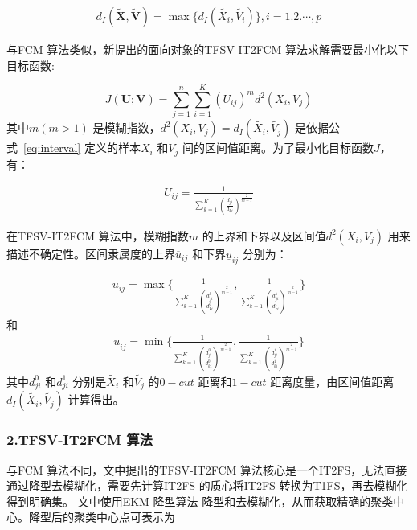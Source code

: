 \begin{equation}\label{eq:eq-6}
    \begin{split}
        d_{I} (\bm{\tilde{X}}, \bm{\tilde{V}}) = \max \lbrace d_{I} (\tilde{X_i}, \tilde{V_i}) \rbrace, i =1.2.\cdots,p
    \end{split}
\end{equation}

与FCM 算法类似，新提出的面向对象的TFSV-IT2FCM 算法求解需要最小化以下目标函数:

\begin{equation}\label{eq:eq-7}
    J(\bm{U};\bm{V}) = \sum _{j=1} ^{n} \sum_{i=1} ^K (U_{ij})^m d^2(X_i,V_j)
\end{equation}
其中$m (m>1)$ 是模糊指数，$d^2(X_i,V_j) = d_{I} (\tilde{X_i}, \tilde{V_j})$ 是依据公式~\ref{eq:interval} 定义的样本$X_i$ 和$V_j$ 间的区间值距离。为了最小化目标函数$J$，有：

\begin{equation}\label{eq:12}
    \begin{split}
        U_{ij} = \frac{1}{\sum_{k=1}^K {(\frac{d_{ji}}{d_{ki}})}^{\frac{2}{m-1}}}
    \end{split}
\end{equation}

在TFSV-IT2FCM 算法中，模糊指数$m$ 的上界和下界以及区间值$d^2(X_i,V_j)$ 用来描述不确定性。区间隶属度的上界$\overline{u}_{ij}$ 和下界$\underline{u}_{ij}$ 分别为：

\begin{equation}\label{eq:13}
    \begin{split}
        \overline{u}_{ij} = \max \Bigg \lbrace \frac{1}{\sum_{k=1}^K {(\frac{d_{ji}^0}{d_{ki}^0})}^{\frac{2}{m-1}}}, \frac{1}{\sum_{k=1}^K {(\frac{d_{ji}^1}{d_{ki}^1})}^{\frac{2}{m-1}}} \Bigg \rbrace
    \end{split}
\end{equation}
和
\begin{equation}\label{eq:14}
    \begin{split}
        \underline{u}_{ij} = \min \Bigg \lbrace \frac{1}{\sum_{k=1}^K {(\frac{d_{ji}^0}{d_{ki}^0})}^{\frac{2}{m-1}}}, \frac{1}{\sum_{k=1}^K {(\frac{d_{ji}^1}{d_{ki}^1})}^{\frac{2}{m-1}}} \Bigg \rbrace
    \end{split}
\end{equation}
其中$d_{ji}^0$ 和$d_{ji}^1$ 分别是$\tilde{X_i}$ 和$\tilde{V_j}$ 的$0-cut$ 距离和$1-cut$ 距离度量，由区间值距离$d_{I} (\tilde{X_i}, \tilde{V_j})$ 计算得出。


\subsubsection*{2.TFSV-IT2FCM 算法}
\label{subsubsec::chap03-3-3-2-2}
与FCM 算法不同，文中提出的TFSV-IT2FCM 算法核心是一个IT2FS，无法直接通过降型去模糊化，需要先计算IT2FS 的质心将IT2FS 转换为T1FS，再去模糊化得到明确集\cite{karnik2001centroid}。 文中使用EKM 降型算法\cite{wu2009enhanced} 降型和去模糊化，从而获取精确的聚类中心。降型后的聚类中心点可表示为

